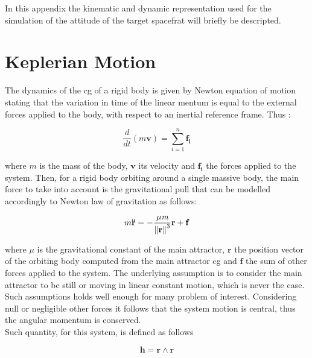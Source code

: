 In this appendix the kinematic and dynamic representation used for the simulation of the attitude of the target spacefrat will briefly be descripted.

\section{Keplerian Motion}
The dynamics of the \acrshort{cg} of a rigid body is given by Newton equation of motion stating that the variation in time of the linear mentum is equal to the external forces applied to the body, with respect to an inertial reference frame. Thus :

\begin{equation}
  \frac{d}{dt} (\textit{m} \mathbf{v}) = \sum\limits_{i=1}^n \mathbf{f_i}
\end{equation}

where $\textit{m}$ is the mass of the body, $\mathbf{v}$ its velocity and $\mathbf{f_i}$ the forces applied to the system. Then, for a rigid body orbiting around a single massive body, the main force to take into account is the gravitational pull that can be modelled accordingly to Newton law of gravitation as follows:

\begin{equation}
  \label{eqn:orbiteqtn}
  m \mathbf{\ddot{r}} = - \frac{\mu \textit{m}} {\left\lVert\mathbf{r}\right\rVert^3} \mathbf{r} + \mathbf{f}
\end{equation}

where $\mu$ is the gravitational constant of the main attractor, $\mathbf{r}$ the position vector of the orbiting body computed from the main attractor \acrshort{cg} and $\mathbf{f}$ the sum of other forces applied to the system. The underlying assumption is to consider the main attractor to be still or moving in linear constant motion, which is never the case. Such assumptions holds well enough for many problem of interest. Considering null or negligible other forces it follows that the system motion is central, thus the angular momentum is conserved.\\
Such quantity, for this system, is defined as follows

\begin{equation}
  \mathbf{h} = \mathbf{r} \wedge \mathbf{r}
\end{equation}

